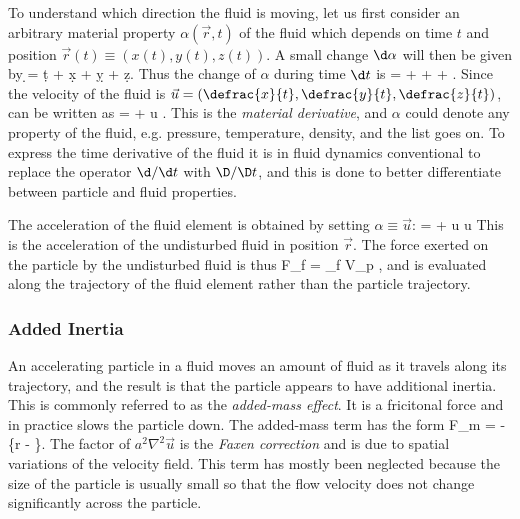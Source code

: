 To understand which direction the fluid is moving, let us first consider an arbitrary material property $\alpha(\vec r, t)$ of the fluid which depends on time $t$ and position $\vec r(t) \equiv (x(t), y(t), z(t))$. A small change $\d \alpha$ will then be given by
\beq
\d \alpha = \d t + \d x + \d y + \d z.
\eeq
Thus the change of $\alpha$ during time $\d t$ is 
\beq
{} =  +  +  + .
\eeq
Since the velocity of the fluid is $\vec u = \left(\defrac{x}{t},\defrac{y}{t},\defrac{z}{t}\right)$,  can be written as
\beq
{} =  + \vec u \cdot \nabla \alpha.
\eeq
This is the \emph{material derivative}, and $\alpha$ could denote any property of the fluid, e.g. pressure, temperature, density, and the list goes on. To express the time derivative of the fluid it is in fluid dynamics conventional to replace the operator $\d/\d t$ with $\D/\D t$, and this is done to better differentiate between particle and fluid properties. 

The acceleration of the fluid element is obtained by setting $\alpha \equiv \vec u$:
\beq
{} =  + \vec u \cdot \nabla \vec u
\eeq
This is the acceleration of the undisturbed fluid in position $\vec r$. The force exerted on the particle by the undisturbed fluid is thus 
\beq 
\vec F_f = \rho_f V_p ,
\eeq
and is evaluated along the trajectory of the fluid element rather than the particle trajectory.


\subsubsection{Added Inertia}

An accelerating particle in a fluid moves an amount of fluid as it travels along its trajectory, and the result is that the particle appears to have additional inertia. This is commonly referred to as the \emph{added-mass effect}. It is a fricitonal force and in practice slows the particle down. The added-mass term has the form
\beq 
\vec F_m = -\left\{\ddvec r - \right\}.\nn
\eeq
The factor of $a^2\nabla^2\vec u$ is the \emph{Faxen correction} and is due to spatial variations of the velocity field. This term has mostly been neglected because the size of the particle is usually small so that the flow velocity does not change significantly across the particle.  

